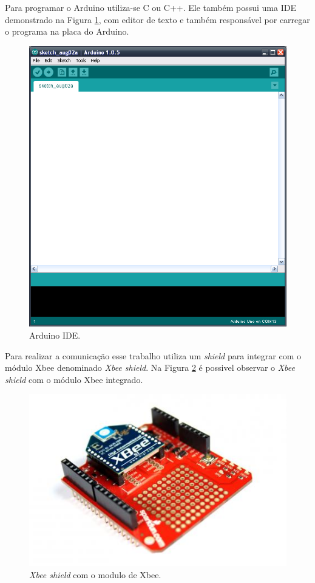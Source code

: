 Para programar o Arduino utiliza-se C ou C++. Ele também possui uma IDE demonstrado na Figura \ref{fig:arduinoIde}, com editor de texto e também responsável por carregar o programa na placa do Arduino.

\begin{figure}[htbp]
	\centering
		\includegraphics[scale=0.2]{referencial/figuras/arduinoIde.png}
	\caption{Arduino IDE.}
	\label{fig:arduinoIde}
\end{figure}

Para realizar a comunicação esse trabalho utiliza um \emph{shield} para integrar com o módulo Xbee denominado \emph{Xbee shield}. Na Figura \ref{fig:xbeeShieldXbee} é possivel observar o \emph{Xbee shield} com o módulo Xbee integrado.   

\begin{figure}[htbp]
	\centering
		\includegraphics[scale=0.3]{referencial/figuras/xbee-shield.jpg}
	\caption{\emph{Xbee shield} com o modulo de Xbee.}
	\label{fig:xbeeShieldXbee}
\end{figure}


